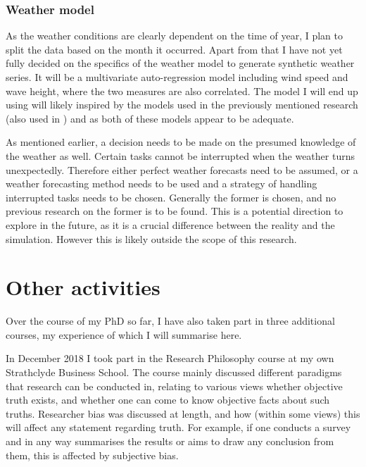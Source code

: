 \documentclass[a4paper,12pt]{article}
\begin{document}
\subsubsection{Weather model} \label{sss:wemo}
As the weather conditions are clearly dependent on the time of year, I plan to split the data based on the month it occurred. Apart from that I have not yet fully decided on the specifics of the weather model to generate synthetic weather series. It will be a multivariate auto-regression model including wind speed and wave height, where the two measures are also correlated. The model I will end up using will likely inspired by the models used in the previously mentioned research \cite{dinwoodie2014operational} (also used in \cite{barlow2018mixed}) and \cite{kerkhove2017optimised} as both of these models appear to be adequate.

As mentioned earlier, a decision needs to be made on the presumed knowledge of the weather as well. Certain tasks cannot be interrupted when the weather turns unexpectedly. Therefore either perfect weather forecasts need to be assumed, or a weather forecasting method needs to be used and a strategy of handling interrupted tasks needs to be chosen. Generally the former is chosen, and no previous research on the former is to be found. This is a potential direction to explore in the future, as it is a crucial difference between the reality and the simulation.  However this is likely outside the scope of this research. 


\pagebreak

\section{Other activities} \label{s:otact}
Over the course of my PhD so far, I have also taken part in three additional courses, my experience of which I will summarise here. 

\bigskip

In December 2018 I took part in the Research Philosophy course at my own Strathclyde Business School. The course mainly discussed different paradigms that research can be conducted in, relating to various views whether objective truth exists, and whether one can come to know objective facts about such truths. Researcher bias was discussed at length, and how (within some views) this will affect any statement regarding truth. For example, if one conducts a survey and in any way summarises the results or aims to draw any conclusion from them, this is affected by subjective bias. 
\end{document}
